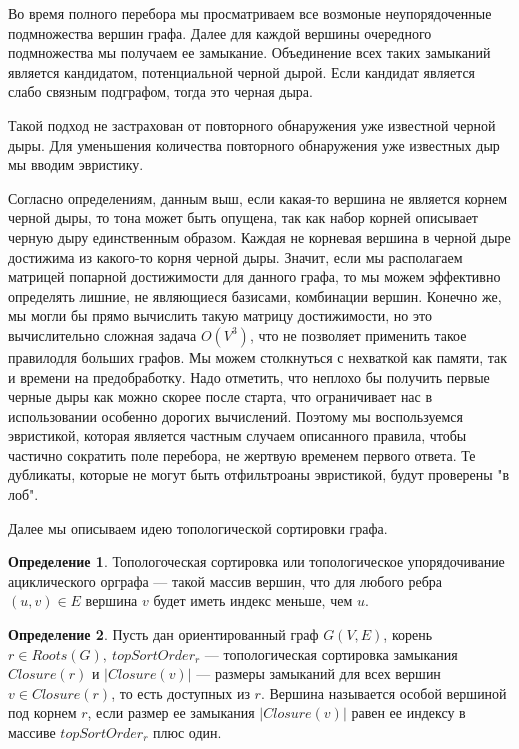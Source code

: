 \documentclass[12pt,a4paper,oneside]{article}
\theoremstyle{definition}
\newtheorem{definition}{Определение}[]
\theoremstyle{lemma}
\theoremstyle{remark}
\begin{document}
Во время полного перебора мы просматриваем все возмоные неупорядоченные подмножества вершин графа. Далее для каждой вершины очередного подмножества мы получаем ее замыкание. Объединение всех таких замыканий является кандидатом, потенциальной черной дырой. Если кандидат является слабо связным подграфом, тогда это черная дыра.

Такой подход не застрахован от повторного обнаружения уже известной черной дыры. Для уменьшения количества повторного обнаружения уже известных дыр мы вводим эвристику.

Согласно определениям, данным выш, если какая-то вершина не является корнем черной дыры, то тона может быть опущена, так как набор корней описывает черную дыру единственным образом. Каждая не корневая вершина в черной дыре достижима из какого-то корня черной дыры. Значит, если мы располагаем матрицей попарной достижимости для данного графа, то мы можем эффективно определять лишние, не являющиеся базисами, комбинации вершин. Конечно же, мы могли бы прямо вычислить такую матрицу достижимости, но это вычислительно сложная задача $O(V^3)$, что не позволяет применить такое правилодля больших графов. Мы можем столкнуться с нехваткой как памяти, так и времени  на предобработку. Надо отметить, что неплохо бы получить первые черные дыры как можно скорее после старта, что ограничивает нас в использовании особенно дорогих вычислений. Поэтому мы воспользуемся эвристикой, которая является частным случаем описанного правила, чтобы частично сократить поле перебора, не жертвую временем первого ответа. Те дубликаты, которые не могут быть отфильтроаны эвристикой, будут проверены "в лоб".

Далее мы описываем идею топологической сортировки графа.

\begin{definition}
Топологоческая сортировка или топологическое упорядочивание ациклического орграфа --- такой массив вершин, что для любого ребра $(u,v) \in E$ вершина $v$ будет иметь индекс меньше, чем $u$.
\end{definition}

\begin{definition}
Пусть дан ориентированный граф $G(V,E)$, корень $r \in Roots(G),\ topSortOrder_r$ --- топологическая сортировка замыкания $Closure(r)$ и $|Closure(v)|$ --- размеры замыканий для всех вершин $v \in Closure(r)$, то есть доступных из $r$. Вершина называется особой вершиной под корнем $r$, если размер ее замыкания $|Closure(v)|$ равен ее индексу в массиве $topSortOrder_r$ плюс один.
\end{definition}
\end{document}
